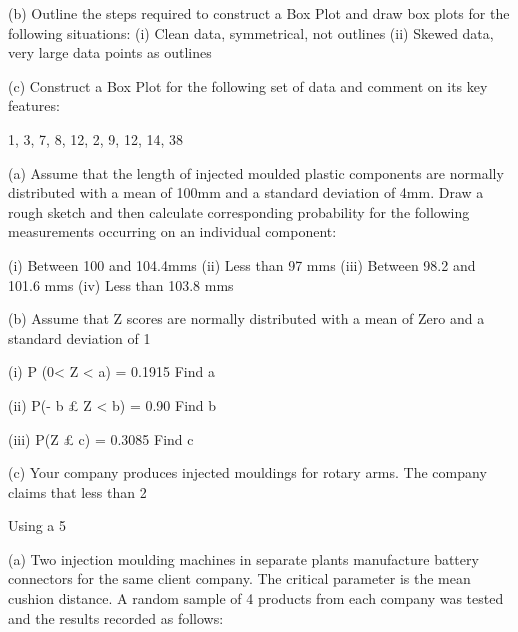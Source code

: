 
(b)	Outline the steps required to construct a Box Plot and draw box plots for the following situations:
(i)	Clean data, symmetrical, not outlines
(ii)	Skewed data, very large data points as outlines

(c)	Construct a Box Plot for the following set of data and comment on its key features:

1, 3, 7, 8, 12, 2, 9, 12, 14, 38



(a)	Assume that the length of injected moulded plastic components are normally distributed with a mean of 100mm and a standard deviation of 4mm.  Draw a rough sketch and then calculate corresponding probability for the following measurements occurring on an individual component:
 
(i)	Between 100 and 104.4mms
(ii)	Less than 97 mms
(iii)	Between 98.2 and 101.6 mms
(iv)	Less than 103.8 mms


(b)	Assume that Z scores are normally distributed with a mean of Zero and a
 	standard deviation of 1
 
(i) 	P (0< Z < a)  =  0.1915 			 Find   a 

(ii)            P(- b £ Z < b) =  0.90		            	 Find   b

     	(iii)             P(Z £ c)  =       0.3085 			 Find   c


(c)	Your company produces injected mouldings for rotary arms. The company claims that less than 2%

Using a 5%


(a) 	Two injection moulding machines in separate plants manufacture battery
connectors for the same client company.  The critical parameter is the mean cushion distance.  A random sample of 4 products from each company was tested and the results recorded as follows:


